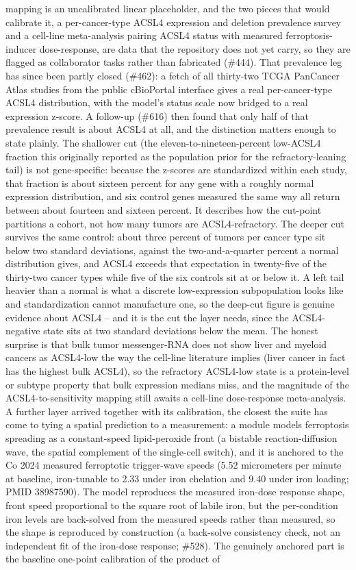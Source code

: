 \documentclass[11pt,twoside,openright]{report}
\begin{document}
mapping is an uncalibrated linear placeholder, and the two pieces that would calibrate it, a per-cancer-type ACSL4 expression and deletion prevalence survey and a cell-line meta-analysis pairing ACSL4 status with measured ferroptosis-inducer dose-response, are data that the repository does not yet carry, so they are flagged as collaborator tasks rather than fabricated (\#444). That prevalence leg has since been partly closed (\#462): a fetch of all thirty-two TCGA PanCancer Atlas studies from the public cBioPortal interface gives a real per-cancer-type ACSL4 distribution, with the model's status scale now bridged to a real expression z-score. A follow-up (\#616) then found that only half of that prevalence result is about ACSL4 at all, and the distinction matters enough to state plainly. The shallower cut (the eleven-to-nineteen-percent low-ACSL4 fraction this originally reported as the population prior for the refractory-leaning tail) is not gene-specific: because the z-scores are standardized within each study, that fraction is about sixteen percent for any gene with a roughly normal expression distribution, and six control genes measured the same way all return between about fourteen and sixteen percent. It describes how the cut-point partitions a cohort, not how many tumors are ACSL4-refractory. The deeper cut survives the same control: about three percent of tumors per cancer type sit below two standard deviations, against the two-and-a-quarter percent a normal distribution gives, and ACSL4 exceeds that expectation in twenty-five of the thirty-two cancer types while five of the six controls sit at or below it. A left tail heavier than a normal is what a discrete low-expression subpopulation looks like and standardization cannot manufacture one, so the deep-cut figure is genuine evidence about ACSL4 -- and it is the cut the layer needs, since the ACSL4-negative state sits at two standard deviations below the mean. The honest surprise is that bulk tumor messenger-RNA does not show liver and myeloid cancers as ACSL4-low the way the cell-line literature implies (liver cancer in fact has the highest bulk ACSL4), so the refractory ACSL4-low state is a protein-level or subtype property that bulk expression medians miss, and the magnitude of the ACSL4-to-sensitivity mapping still awaits a cell-line dose-response meta-analysis. A further layer arrived together with its calibration, the closest the suite has come to tying a spatial prediction to a measurement: a  module models ferroptosis spreading as a constant-speed lipid-peroxide front (a bistable reaction-diffusion wave, the spatial complement of the single-cell switch), and it is anchored to the Co 2024 measured ferroptotic trigger-wave speeds (5.52 micrometers per minute at baseline, iron-tunable to 2.33 under iron chelation and 9.40 under iron loading; PMID 38987590). The model reproduces the measured iron-dose response shape, front speed proportional to the square root of labile iron, but the per-condition iron levels are back-solved from the measured speeds rather than measured, so the shape is reproduced by construction (a back-solve consistency check, not an independent fit of the iron-dose response; \#528). The genuinely anchored part is the baseline one-point calibration of the product of 
\end{document}
